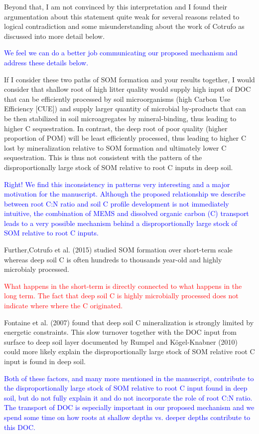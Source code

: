 \documentclass[]{article}
\begin{document}
Beyond that, I am not convinced by this interpretation and I found their
argumentation about this statement quite weak for several reasons
related to logical contradiction and some misunderstanding about the
work of Cotrufo as discussed into more detail below.

\textcolor{blue}{We feel we can do a better job communicating our proposed mechanism and address these details below.}

If I consider these two paths of SOM formation and your results
together, I would consider that shallow root of high litter quality
would supply high input of DOC that can be efficiently processed by soil
microorganisms (high Carbon Use Efficiency {[}CUE{]}) and supply larger
quantity of microbial by-products that can be then stabilized in soil
microagregates by mineral-binding, thus leading to higher C
sequestration. In contrast, the deep root of poor quality (higher
proportion of POM) will be least efficiently processed, thus leading to
higher C lost by mineralization relative to SOM formation and ultimately
lower C sequestration. This is thus not consistent with the pattern of
the disproportionally large stock of SOM relative to root C inputs in
deep soil.

\textcolor{blue}{Right! We find this inconsistency in patterns very interesting and a major motivation for the manuscript. Although the proposed relationship we describe between root C:N ratio and soil C profile development is not immediately intuitive, the combination of MEMS and dissolved organic carbon (C) transport leads to a very possible mechanism behind a disproportionally large stock of SOM relative to root C inputs.}

Further,Cotrufo et al. (2015) studied SOM formation over short-term
scale whereas deep soil C is often hundreds to thousands year-old and
highly microbialy processed.

\textcolor{red}{What happens in the short-term is directly connected to what happens in the long term. The fact that deep soil C is highly microbially processed does not indicate where where the C originated.}

Fontaine et al. (2007) found that deep soil C mineralization is strongly
limited by energetic constraints. This slow turnover together with the
DOC input from surface to deep soil layer documented by Rumpel and
Kögel-Knabner (2010) could more likely explain the disproportionally
large stock of SOM relative root C input is found in deep soil.

\textcolor{blue}{Both of these factors, and many more mentioned in the manuscript, contribute to the disproportionally large stock of SOM relative to root C input found in deep soil, but do not fully explain it and do not incorporate the role of root C:N ratio. The transport of DOC is especially important in our proposed mechanism and we spend some time on how roots at shallow depths vs. deeper depths contribute to this DOC.}
\end{document}
